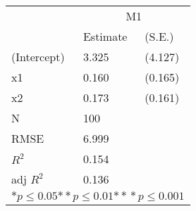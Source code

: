 \begin{tabular}{*{3}{l}}
\hline
                  & \multicolumn{2}{c}{M1}   \tabularnewline
                   &Estimate  &(S.E.)  \tabularnewline
 \hline
 \hline
   (Intercept)     &3.325   &   (4.127) \tabularnewline
   x1              &0.160   &   (0.165) \tabularnewline
   x2              &0.173   &   (0.161) \tabularnewline
 \hline
 N                 &100       &        \tabularnewline
 RMSE             &6.999         & \tabularnewline
 $R^2$             &0.154         & \tabularnewline
 adj $R^2$         &0.136         & \tabularnewline
 \hline
\hline
 
 \multicolumn{3}{c}{${*  p}\le 0.05$${*\!\!*  p}\le 0.01$${*\!\!*\!\!*  p}\le 0.001$}\tabularnewline
 \end{tabular}